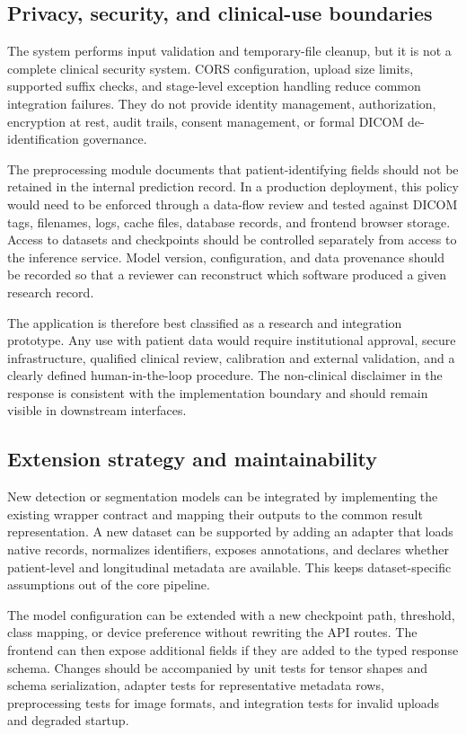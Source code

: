 \documentclass[12pt,a4paper]{article}
\begin{document}
\subsection{Privacy, security, and clinical-use boundaries}
The system performs input validation and temporary-file cleanup, but it is not a complete clinical security system. CORS configuration, upload size limits, supported suffix checks, and stage-level exception handling reduce common integration failures. They do not provide identity management, authorization, encryption at rest, audit trails, consent management, or formal DICOM de-identification governance.

The preprocessing module documents that patient-identifying fields should not be retained in the internal prediction record. In a production deployment, this policy would need to be enforced through a data-flow review and tested against DICOM tags, filenames, logs, cache files, database records, and frontend browser storage. Access to datasets and checkpoints should be controlled separately from access to the inference service. Model version, configuration, and data provenance should be recorded so that a reviewer can reconstruct which software produced a given research record.

The application is therefore best classified as a research and integration prototype. Any use with patient data would require institutional approval, secure infrastructure, qualified clinical review, calibration and external validation, and a clearly defined human-in-the-loop procedure. The non-clinical disclaimer in the response is consistent with the implementation boundary and should remain visible in downstream interfaces.

\subsection{Extension strategy and maintainability}
New detection or segmentation models can be integrated by implementing the existing wrapper contract and mapping their outputs to the common result representation. A new dataset can be supported by adding an adapter that loads native records, normalizes identifiers, exposes annotations, and declares whether patient-level and longitudinal metadata are available. This keeps dataset-specific assumptions out of the core pipeline.

The model configuration can be extended with a new checkpoint path, threshold, class mapping, or device preference without rewriting the API routes. The frontend can then expose additional fields if they are added to the typed response schema. Changes should be accompanied by unit tests for tensor shapes and schema serialization, adapter tests for representative metadata rows, preprocessing tests for image formats, and integration tests for invalid uploads and degraded startup.
\end{document}
